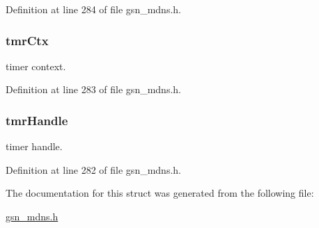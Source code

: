 Definition at line 284 of file gsn\_\-mdns.h.

\hypertarget{a00455_a963f9a3df571404f182b389d679ad283}{
\subsubsection[{tmrCtx}]{ {\bf tmrCtx}}}
\label{a00455_a963f9a3df571404f182b389d679ad283}
timer context. 

Definition at line 283 of file gsn\_\-mdns.h.

\hypertarget{a00455_a0097381a660d9af2442a1b78638239e1}{
\subsubsection[{tmrHandle}]{ {\bf tmrHandle}}}
\label{a00455_a0097381a660d9af2442a1b78638239e1}
timer handle. 

Definition at line 282 of file gsn\_\-mdns.h.



The documentation for this struct was generated from the following file:\begin{DoxyCompactItemize}
\item 
\hyperlink{a00526}{gsn\_\-mdns.h}\end{DoxyCompactItemize}
